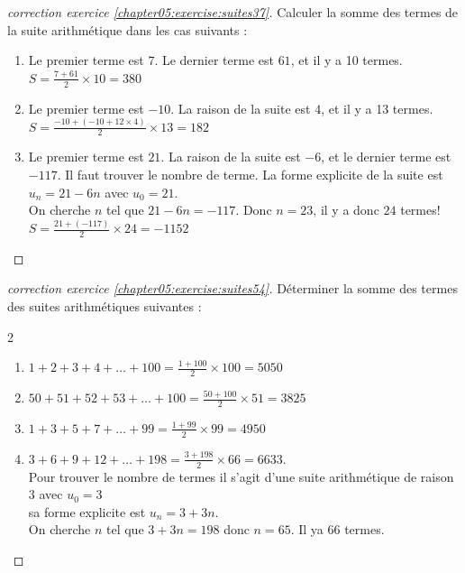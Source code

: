 \documentclass[main.tex]{subfiles}
\begin{document}
 
%
\begin{proof}[correction exercice \ref{chapter05:exercise:suites37}]   Calculer la somme des termes de la suite arithmétique dans les cas suivants :
\begin{enumerate}[leftmargin=*,label=\arabic*)]
	\item Le premier terme est $7$. Le dernier terme est $61$, et il y a 10 termes.\\ \colorbox{BurntOrange}{$S=\frac{7+61}{2}\times 10=380$}
	\item Le premier terme est $-10$. La raison de la suite est $4$, et il y a 13 termes.\\ \colorbox{BurntOrange}{$S=\frac{-10+(-10+12\times 4)}{2}\times 13=182$}
	\item Le premier terme est $21$. La raison de la suite est $-6$, et le dernier terme est $-117$.  \colorbox{BurntOrange}{Il faut trouver le nombre de terme. La forme explicite de la suite est $u_n=21-6n$ avec $u_0=21$.}\\
	\colorbox{BurntOrange}{
		 On cherche $n$ tel que $21-6n=-117$. Donc $n=23$, il y a donc $24$ termes!}\\ \colorbox{BurntOrange}{$S=\frac{21+(-117)}{2}\times 24=-1152$}
\end{enumerate} 
\end{proof}
\begin{proof}[correction exercice \ref{chapter05:exercise:suites54}] Déterminer la somme des termes des suites arithmétiques suivantes :
\begin{spacing}{2}
	\vspace{-0.5em}
	\begin{enumerate}[leftmargin=*,label=\arabic*)]
		\item $1+2+3+4+\ldots +100=$\colorbox{BurntOrange}{$\frac{1+100}{2}\times 100=5050$} \dotfill 
		\item $50+51+52+53+\ldots +100=$\colorbox{BurntOrange}{$\frac{50+100}{2}\times 51=3825$} \dotfill 
		\item $1+3+5+7+\ldots +99 =$\colorbox{BurntOrange}{$\frac{1+99}{2}\times 99=4950$} \dotfill 
		\item $3+6+9+12+\ldots + 198=$\colorbox{BurntOrange}{$\frac{3+198}{2}\times 66= 6633$}.\\
		\colorbox{BurntOrange}{ Pour trouver le nombre de termes il s'agit d'une suite arithmétique de raison $3$ avec $u_0=3$}\\
		\colorbox{BurntOrange}{sa forme explicite est $u_n=3+3n$.}\\
		\colorbox{BurntOrange}{ On cherche $n$ tel que $3+3n=198$ donc $n=65$. Il ya $66$ termes.} 
	\end{enumerate}
\end{spacing}
\vspace{-0.75em}
\end{proof} 
\end{document}
